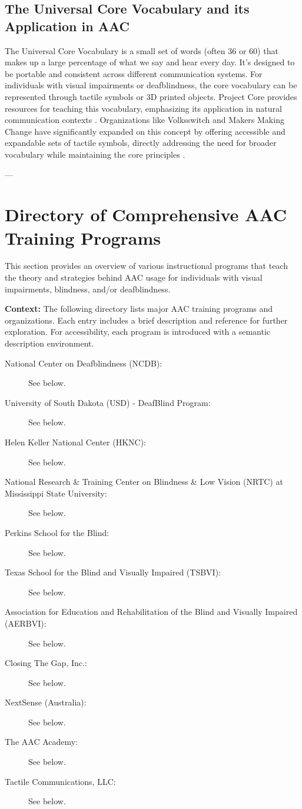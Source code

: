 \subsection{The Universal Core Vocabulary and its Application in AAC}

The Universal Core Vocabulary is a small set of words (often 36 or 60) that makes up a large percentage of what we say and hear every day. It's designed to be portable and consistent across different communication systems. For individuals with visual impairments or deafblindness, the core vocabulary can be represented through tactile symbols or 3D printed objects. Project Core provides resources for teaching this vocabulary, emphasizing its application in natural communication contexts  \cite{ProjectCore}. Organizations like Volksswitch and Makers Making Change have significantly expanded on this concept by offering accessible and expandable sets of tactile symbols, directly addressing the need for broader vocabulary while maintaining the core principles  \cite{Volksswitch_Bliss}.

---

\section{Directory of Comprehensive AAC Training Programs}

This section provides an overview of various instructional programs that teach the theory and strategies behind AAC usage for individuals with visual impairments, blindness, and/or deafblindness.


\textbf{Context:} The following directory lists major AAC training programs and organizations. Each entry includes a brief description and reference for further exploration. For accessibility, each program is introduced with a semantic description environment.

\begin{description}
\item[National Center on Deafblindness (NCDB):] See below.
\item[University of South Dakota (USD) - DeafBlind Program:] See below.
\item[Helen Keller National Center (HKNC):] See below.
\item[National Research \& Training Center on Blindness \& Low Vision (NRTC) at Mississippi State University:] See below.
\item[Perkins School for the Blind:] See below.
\item[Texas School for the Blind and Visually Impaired (TSBVI):] See below.
\item[Association for Education and Rehabilitation of the Blind and Visually Impaired (AERBVI):] See below.
\item[Closing The Gap, Inc.:] See below.
\item[NextSense (Australia):] See below.
\item[The AAC Academy:] See below.
\item[Tactile Communications, LLC:] See below.
\end{description}

